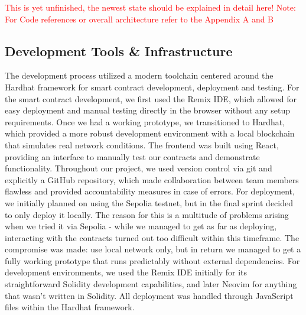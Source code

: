 \documentclass[11pt,a4paper]{article}
\begin{document}
    \textcolor{red}{This is yet unfinished, the newest state should be explained in detail here! Note: For Code references or overall architecture refer to the Appendix A and B}

	\subsection{Development Tools \& Infrastructure}\label{subsec:development-tools-infrastructure}
	The development process utilized a modern toolchain centered around the Hardhat framework for smart contract development, deployment and testing.
	For the smart contract development, we first used the Remix IDE, which allowed for easy deployment and manual testing directly in the browser without any setup requirements.
	Once we had a working prototype, we transitioned to Hardhat, which provided a more robust development environment with a local blockchain that simulates real network conditions.
	The frontend was built using React, providing an interface to manually test our contracts and demonstrate functionality.
	Throughout our project, we used version control via git and explicitly a GitHub repository, which made collaboration between team members flawless and provided accountability measures in case of errors.
	For deployment, we initially planned on using the Sepolia testnet, but in the final sprint decided to only deploy it locally.
	The reason for this is a multitude of problems arising when we tried it via Sepolia - while we managed to get as far as deploying, interacting with the contracts turned out too difficult within this timeframe.
	The compromise was made: use local network only, but in return we managed to get a fully working prototype that runs predictably without external dependencies.
	For development environments, we used the Remix IDE initially for its straightforward Solidity development capabilities, and later Neovim for anything that wasn't written in Solidity.
	All deployment was handled through JavaScript files within the Hardhat framework. 
\end{document}

